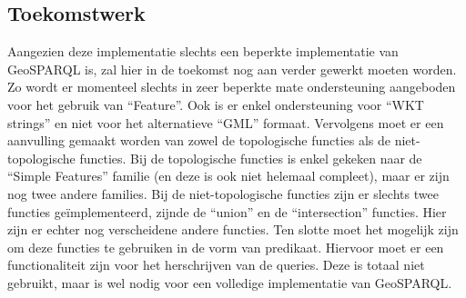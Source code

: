 \subsection{Toekomstwerk}
Aangezien deze implementatie slechts een beperkte implementatie van GeoSPARQL is, zal hier in de toekomst nog aan verder gewerkt moeten worden. Zo wordt er momenteel slechts in zeer beperkte mate ondersteuning aangeboden voor het gebruik van ``Feature''. Ook is er enkel ondersteuning voor ``WKT strings'' en niet voor het alternatieve ``GML'' formaat. Vervolgens moet er een aanvulling gemaakt worden van zowel de topologische functies als de niet-topologische functies. Bij de topologische functies is enkel gekeken naar de ``Simple Features'' familie (en deze is ook niet helemaal compleet), maar er zijn nog twee andere families. Bij de niet-topologische functies zijn er slechts twee functies geïmplementeerd, zijnde de ``union'' en de ``intersection'' functies. Hier zijn er echter nog verscheidene andere functies. Ten slotte moet het mogelijk zijn om deze functies te gebruiken in de vorm van predikaat. Hiervoor moet er een functionaliteit zijn voor het herschrijven van de queries. Deze is totaal niet gebruikt, maar is wel nodig voor een volledige implementatie van GeoSPARQL. 